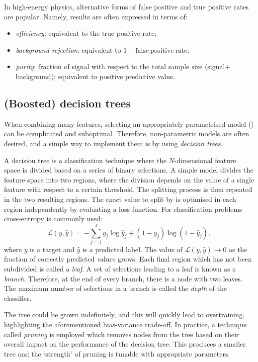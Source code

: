 In high-energy physics, alternative forms of false positive and true positive rates are popular.
Namely, results are often expressed in terms of:
\begin{itemize}
    \item \textit{efficiency}: equivalent to the true positive rate;
    \item \textit{background rejection}: equivalent to $1 - \mathrm{false~positive~rate}$;
    \item \textit{purity}: fraction of signal with respect to the total sample size (signal$+$background); equivalent to positive predictive value.
\end{itemize}

\subsection{(Boosted) decision trees}\label{sec:BDTs_theory}

When combining many features, selecting an appropriately parametrised model () can be complicated and suboptimal.
Therefore, non-parametric models are often desired, and a simple way to implement them is by using \textit{decision trees}.

A decision tree is a classification technique where the $N$-dimensional feature space is divided based on a series of binary selections.
A simple model divides the feature space into two regions, where the division depends on the value of a single feature with respect to a certain threshold. 
The splitting process is then repeated in the two resulting regions.
The exact value to split by is optimised in each region independently by evaluating a loss function.
For classification problems cross-entropy is commonly used:
\begin{equation}
    \mathcal{L}(y,\hat{y})=-\sum_{j=1}^J y_j\log \hat{y}_j + (1-y_j)\log(1-\hat{y}_j),
\end{equation}
where $y$ is a target and $\hat{y}$ is a predicted label. 
The value of $\mathcal{L}(y,\hat{y})\to0$ as the fraction of correctly predicted values grows.
Each final region which has not been subdivided is called a \textit{leaf}.
A set of selections leading to a leaf is known as a \textit{branch}. 
Therefore, at the end of every branch, there is a node with two leaves.
The maximum number of selections in a branch is called the \textit{depth} of the classifier.

The tree could be grown indefinitely, and this will quickly lead to overtraining, highlighting the aforementioned bias-variance trade-off.
In practice, a technique called \textit{pruning} is employed which removes nodes from the tree based on their overall impact on the performance of the decision tree.
This produces a smaller tree and the `strength' of pruning is tunable with appropriate parameters.

